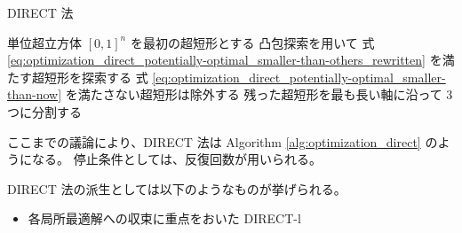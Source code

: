 \begin{algorithm}[tp]
    \caption{DIRECT 法}
    \label{alg:optimization_direct}
    \begin{algorithmic}
            \State 単位超立方体 $[0, 1]^n$ を最初の超短形とする
            \Loop
                \State 凸包探索を用いて
                    式 \eqref{eq:optimization_direct_potentially-optimal_smaller-than-others_rewritten}
                    を満たす超短形を探索する
                \State 式 \eqref{eq:optimization_direct_potentially-optimal_smaller-than-now}
                    を満たさない超短形は除外する
                \State 残った超短形を最も長い軸に沿って 3 つに分割する
                    \State \Return
                \EndIf
            \EndLoop
        \EndProcedure
    \end{algorithmic}
\end{algorithm}

ここまでの議論により、DIRECT 法は
Algorithm \ref{alg:optimization_direct} のようになる。
停止条件としては、反復回数が用いられる。

DIRECT 法の派生としては以下のようなものが挙げられる。

\begin{itemize}
    \item 各局所最適解への収束に重点をおいた DIRECT-l \cite{Gablonsky2001}
\end{itemize}

